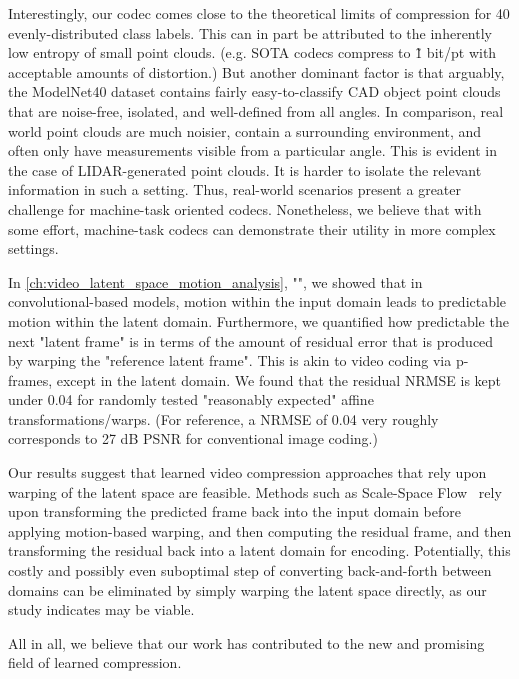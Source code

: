 Interestingly, our codec comes close to the theoretical limits of compression for 40 evenly-distributed class labels.
This can in part be attributed to the inherently low entropy of small point clouds.
(e.g. SOTA codecs compress to \~1 bit/pt with acceptable amounts of distortion.)
But another dominant factor is that arguably, the ModelNet40 dataset contains fairly easy-to-classify CAD object point clouds that are noise-free, isolated, and well-defined from all angles.
In comparison, real world point clouds are much noisier, contain a surrounding environment, and often only have measurements visible from a particular angle.
This is evident in the case of LIDAR-generated point clouds.
It is harder to isolate the relevant information in such a setting.
Thus, real-world scenarios present a greater challenge for machine-task oriented codecs.
Nonetheless, we believe that with some effort, machine-task codecs can demonstrate their utility in more complex settings.

In \cref{ch:video_latent_space_motion_analysis}, "", we showed that in convolutional-based models, motion within the input domain leads to predictable motion within the latent domain.
Furthermore, we quantified how predictable the next "latent frame" is in terms of the amount of residual error that is produced by warping the "reference latent frame".
This is akin to video coding via p-frames, except in the latent domain.
We found that the residual NRMSE is kept under 0.04 for randomly tested "reasonably expected" affine transformations/warps.
(For reference, a NRMSE of 0.04 very roughly corresponds to 27 dB PSNR for conventional image coding.)

Our results suggest that learned video compression approaches that rely upon warping of the latent space are feasible.
Methods such as Scale-Space Flow~\cite{agustsson2020scalespaceflow} rely upon transforming the predicted frame back into the input domain before applying motion-based warping, and then computing the residual frame, and then transforming the residual back into a latent domain for encoding.
Potentially, this costly and possibly even suboptimal step of converting back-and-forth between domains can be eliminated by simply warping the latent space directly, as our study indicates may be viable.

All in all, we believe that our work has contributed to the new and promising field of learned compression.
